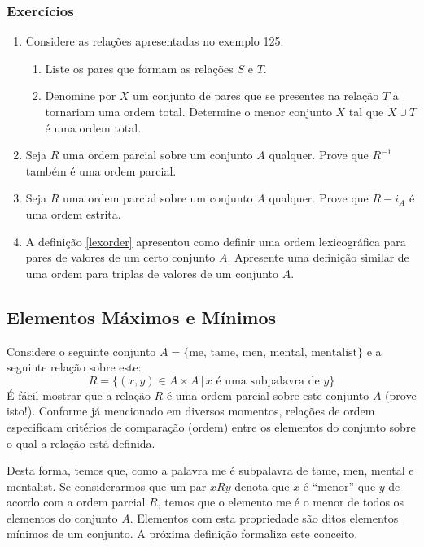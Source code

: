 \subsubsection{Exercícios}
\begin{enumerate}
  \item Considere as relações apresentadas no exemplo
    125.
  \begin{enumerate}
    \item Liste os pares que formam as relações $S$ e $T$.
    \item Denomine por $X$ um conjunto de pares que se presentes na
      relação $T$ a tornariam uma ordem total. Determine o menor
      conjunto $X$ tal que $X \cup T$ é uma ordem total.
  \end{enumerate}
  \item Seja $R$ uma ordem parcial sobre um conjunto $A$
    qualquer. Prove que $R^{-1}$ também é uma ordem parcial.
  \item Seja $R$ uma ordem parcial sobre um conjunto $A$ qualquer.
   Prove que $R - i_A$ é uma ordem estrita.
  \item A definição \ref{lexorder} apresentou como definir uma ordem
   lexicográfica para pares de valores de um certo conjunto
   $A$. Apresente uma definição similar de uma ordem para triplas de
   valores de um conjunto $A$.
\end{enumerate}

\subsection{Elementos Máximos e Mínimos}

Considere o seguinte conjunto $A =\{\text{me, tame, men, mental,
  mentalist}\}$ e a seguinte relação sobre este:
\[
R = \{(x,y)\in A \times A\,|\,x \text{ é uma subpalavra de }y\}
\]
É fácil mostrar que a relação $R$ é uma ordem parcial sobre este
conjunto $A$ (prove isto!). Conforme já mencionado em diversos
momentos, relações de ordem especificam critérios de comparação
(ordem) entre os elementos do conjunto sobre o qual a relação está definida.

Desta forma, temos que, como a palavra me é subpalavra de tame, men,
mental e mentalist. Se considerarmos que um par $xRy$ denota que $x$ é
``menor'' que $y$ de acordo com a ordem parcial $R$, temos que o
elemento me é o menor de todos os elementos do conjunto $A$. Elementos
com esta propriedade são ditos elementos mínimos de um conjunto. A
próxima definição formaliza este conceito.

